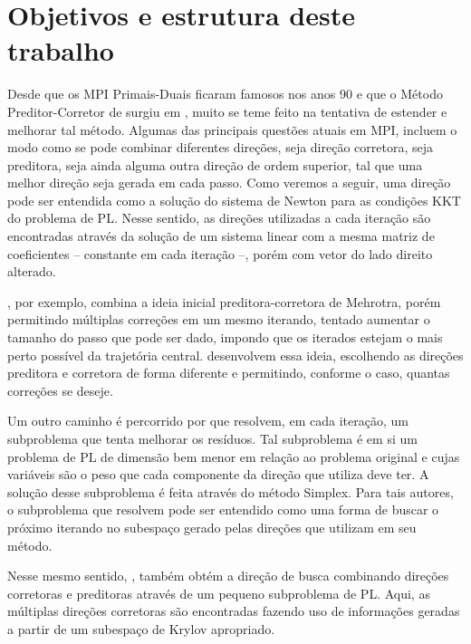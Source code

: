 


\section*{Objetivos e estrutura deste trabalho}




Desde que os   \acf{MPI} Primais-Duais ficaram famosos nos anos 90 e que o Método Preditor-Corretor de \textcite{Mehrotra:1992wr} surgiu em \citeyear{Mehrotra:1992wr}, muito se teme feito na tentativa de estender e melhorar tal método. Algumas das principais questões atuais em \ac{MPI}, incluem o modo como se pode combinar diferentes direções, seja direção corretora, seja preditora, seja ainda alguma outra direção de  ordem superior, tal que uma melhor direção seja gerada em cada passo.  Como veremos a seguir, uma direção pode ser entendida como a solução do sistema de Newton para as condições KKT do problema de  \ac{PL}. Nesse sentido, as direções utilizadas a cada iteração são encontradas através da solução de um sistema linear com a mesma matriz de coeficientes  -- constante em cada iteração --, porém com vetor do lado direito alterado.


\textcite{Gondzio:1996uw}, por exemplo, combina a ideia inicial preditora-corretora de Mehrotra, porém permitindo múltiplas correções em um mesmo iterando, tentado aumentar o tamanho do passo que pode ser dado, impondo que os iterados estejam o mais perto possível da trajetória central. \textcite{Colombo:2008ia} desenvolvem essa ideia, escolhendo as direções preditora e corretora de forma diferente e permitindo, conforme o caso, quantas correções se deseje. 

Um outro caminho é percorrido por \textcite{Jarre:1999tl} que resolvem, em cada iteração, um subproblema que tenta melhorar os resíduos. Tal subproblema  é em si um problema de PL de dimensão bem  menor em relação ao problema original e cujas variáveis são o peso que cada componente da direção que utiliza deve ter. A solução desse subproblema é feita através do método Simplex. Para tais autores, o subproblema que resolvem pode ser entendido como uma forma de buscar o próximo iterando no subespaço gerado pelas direções que utilizam em seu método.


Nesse mesmo sentido, \textcite{Mehrotra:2005do}, também obtém a direção de busca combinando direções corretoras e preditoras  através de um pequeno subproblema de \ac{PL}. Aqui, as múltiplas  direções corretoras são encontradas fazendo uso de informações geradas a partir de um  subespaço de Krylov apropriado.



